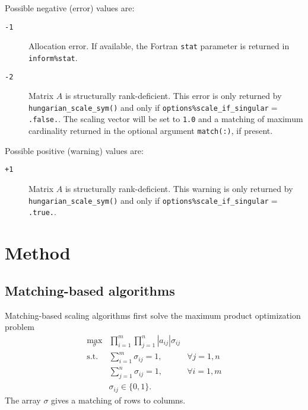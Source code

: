 Possible negative (error) values are:
\begin{description}
\item[\texttt{-1}] Allocation error. If available, the Fortran \texttt{stat} parameter is returned in \texttt{inform\%stat}.
\item[\texttt{-2}] Matrix $A$ is structurally rank-deficient. This error is only
   returned by \texttt{hungarian\_scale\_sym()} and only if
   \texttt{options\%scale\_if\_singular}$=$\texttt{.false.}. The scaling vector
   will be set to \texttt{1.0} and a matching of maximum cardinality returned
   in the optional argument \texttt{match(:)}, if present.
\end{description}

Possible positive (warning) values are:
\begin{description}
\item[\texttt{+1}] Matrix $A$ is structurally rank-deficient. This warning is
   only returned by \texttt{hungarian\_scale\_sym()} and only if
   \texttt{options\%scale\_if\_singular}$=$\texttt{.true.}.
\end{description}


\section{Method} \label{method}

\subsection{Matching-based algorithms}

Matching-based scaling algorithms first solve the maximum product optimization
problem
\begin{eqnarray*}
   \max_{\sigma} & \prod_{i=1}^m\prod_{j=1}^n |a_{ij}|\sigma_{ij} & \\
   \mathrm{s.t.} & \sum_{i=1}^m\sigma_{ij} = 1, & \forall j=1,n \\
                 & \sum_{j=1}^n\sigma_{ij} = 1, & \forall i=1,m \\
                 & \sigma_{ij} \in \{0,1\}.
\end{eqnarray*}
The array $\sigma$ gives a matching of rows to columns.

